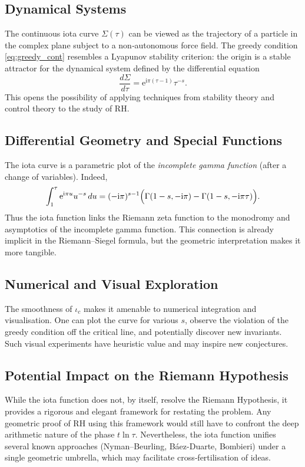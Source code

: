 \documentclass[11pt]{article}
\newcommand{\iu}{\mathrm{i}} %
\newcommand{\e}{\mathrm{e}}
\begin{document}
\subsection{Dynamical Systems}
The continuous iota curve $\Sigma(\tau)$ can be viewed as the trajectory of a particle in the complex plane subject to a non‑autonomous force field.  The greedy condition \eqref{eq:greedy_cont} resembles a Lyapunov stability criterion: the origin is a stable attractor for the dynamical system defined by the differential equation
\[
  \frac{d\Sigma}{d\tau} = \e^{\iu\pi(\tau-1)} \tau^{-s}.
\]
This opens the possibility of applying techniques from stability theory and control theory to the study of RH.

\subsection{Differential Geometry and Special Functions}
The iota curve is a parametric plot of the \emph{incomplete gamma function} (after a change of variables).  Indeed,
\[
  \int_1^\tau \e^{\iu\pi u} u^{-s}\,du = (-\iu\pi)^{s-1} \Bigl( \Gamma(1-s, -\iu\pi) - \Gamma(1-s, -\iu\pi\tau) \Bigr).
\]
Thus the iota function links the Riemann zeta function to the monodromy and asymptotics of the incomplete gamma function.  This connection is already implicit in the Riemann--Siegel formula, but the geometric interpretation makes it more tangible.

\subsection{Numerical and Visual Exploration}
The smoothness of $\iota_c$ makes it amenable to numerical integration and visualisation.  One can plot the curve for various $s$, observe the violation of the greedy condition off the critical line, and potentially discover new invariants.  Such visual experiments have heuristic value and may inspire new conjectures.

\subsection{Potential Impact on the Riemann Hypothesis}
While the iota function does not, by itself, resolve the Riemann Hypothesis, it provides a rigorous and elegant framework for restating the problem.  Any geometric proof of RH using this framework would still have to confront the deep arithmetic nature of the phase $t\ln\tau$.  Nevertheless, the iota function unifies several known approaches (Nyman--Beurling, B\'aez-Duarte, Bombieri) under a single geometric umbrella, which may facilitate cross‑fertilisation of ideas.
\end{document}
